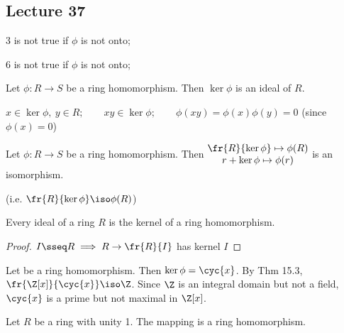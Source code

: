 \documentclass[a4paper]{article}
\begin{document}
\subsection*{Lecture 37} %

\begin{note}
  3 is not true if \( \phi \) is not onto; 

  6 is not true if \( \phi \) is not onto; 
\end{note}

\begin{theorem}
  Let \( \phi:R\to S \) be a ring homomorphism. Then \( \ker\phi \) is an ideal of \( R \).
  \begin{note}
    \( x\in\ker\phi,\ y\in R; \qquad xy\in\ker\phi; \qquad \phi(xy)=\phi(x)\phi(y) = 0\) (since \( \phi(x)=0 \))
  \end{note}
\end{theorem}

\begin{theorem}
  Let \( \phi:R\to S \) be a ring homomorphism. Then \( \begin{matrix}
    \fr{R}{\ker\phi} \mapsto \phi(R) \\
    r + \ker\phi \mapsto \phi(r)
  \end{matrix} \) is an isomorphism.

  (i.e. \( \fr{R}{\ker\phi} \iso \phi(R) \))
\end{theorem}

\begin{theorem}
  Every ideal of a ring \( R \) is the kernel of a ring homomorphism.
\end{theorem}

\begin{proof}
  \( I\sseq R\implies R\to\fr{R}{I} \) has kernel \( I \)
\end{proof}

\begin{example}
  Let  be a ring homomorphism. Then \( \ker\phi = \cyc{x} \). By Thm 15.3, \( \fr{\Z[x]}{\cyc{x}}\iso\Z \). Since \( \Z \) is an integral domain but not a field, \( \cyc{x} \) is a prime but not maximal in \( \Z[x] \).
\end{example}

\begin{theorem}
  Let \( R \) be a ring with unity 1. The mapping  is a ring homomorphism.
\end{theorem}
\end{document}
